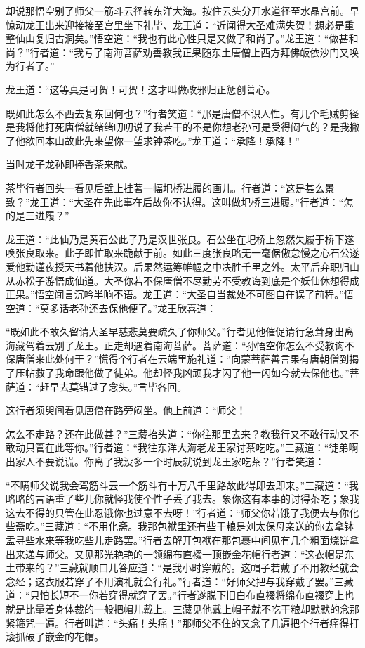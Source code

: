 \documentclass[12pt,UTF8]{ctexbook}
\begin{document}
{却说那悟空别了师父一筋斗云径转东洋大海。按住云头分开水道径至水晶宫前。早惊动龙王出来迎接接至宫里坐下礼毕、龙王道：“近闻得大圣难满失贺！想必是重整仙山复归古洞矣。”悟空道：“我也有此心性只是又做了和尚了。”龙王道：“做甚和尚？”行者道：“我亏了南海菩萨劝善教我正果随东土唐僧上西方拜佛皈依沙门又唤为行者了。”

龙王道：“这等真是可贺！可贺！这才叫做改邪归正惩创善心。

既如此怎么不西去复东回何也？”行者笑道：“那是唐僧不识人性。有几个毛贼剪径是我将他打死唐僧就绪绪叨叨说了我若干的不是你想老孙可是受得闷气的？是我撇了他欲回本山故此先来望你一望求钟茶吃。”龙王道：“承降！承降！”

当时龙子龙孙即捧香茶来献。

茶毕行者回头一看见后壁上挂著一幅圯桥进履的画儿。行者道：“这是甚么景致？”龙王道：“大圣在先此事在后故你不认得。这叫做圯桥三进履。”行者道：“怎的是三进履？”

龙王道：“此仙乃是黄石公此子乃是汉世张良。石公坐在圯桥上忽然失履于桥下遂唤张良取来。此子即忙取来跪献于前。如此三度张良略无一毫倨傲怠慢之心石公遂爱他勤谨夜授天书着他扶汉。后果然运筹帷幄之中决胜千里之外。太平后弃职归山从赤松子游悟成仙道。大圣你若不保唐僧不尽勤劳不受教诲到底是个妖仙休想得成正果。”悟空闻言沉吟半晌不语。龙王道：“大圣自当裁处不可图自在误了前程。”悟空道：“莫多话老孙还去保他便了。”龙王欣喜道：

“既如此不敢久留请大圣早慈悲莫要疏久了你师父。”行者见他催促请行急耸身出离海藏驾着云别了龙王。正走却遇着南海菩萨。菩萨道：“孙悟空你怎么不受教诲不保唐僧来此处何干？”慌得个行者在云端里施礼道：“向蒙菩萨善言果有唐朝僧到揭了压帖救了我命跟他做了徒弟。他却怪我凶顽我才闪了他一闪如今就去保他也。”菩萨道：“赶早去莫错过了念头。”言毕各回。

这行者须臾间看见唐僧在路旁闷坐。他上前道：“师父！

怎么不走路？还在此做甚？”三藏抬头道：“你往那里去来？教我行又不敢行动又不敢动只管在此等你。”行者道：“我往东洋大海老龙王家讨茶吃吃。”三藏道：“徒弟啊出家人不要说谎。你离了我没多一个时辰就说到龙王家吃茶？”行者笑道：

“不瞒师父说我会驾筋斗云一个筋斗有十万八千里路故此得即去即来。”三藏道：“我略略的言语重了些儿你就怪我使个性子丢了我去。象你这有本事的讨得茶吃；象我这去不得的只管在此忍饿你也过意不去呀！”行者道：“师父你若饿了我便去与你化些斋吃。”三藏道：“不用化斋。我那包袱里还有些干粮是刘太保母亲送的你去拿钵盂寻些水来等我吃些儿走路罢。”行者去解开包袱在那包裹中间见有几个粗面烧饼拿出来递与师父。又见那光艳艳的一领绵布直裰一顶嵌金花帽行者道：“这衣帽是东土带来的？”三藏就顺口儿答应道：“是我小时穿戴的。这帽子若戴了不用教经就会念经；这衣服若穿了不用演礼就会行礼。”行者道：“好师父把与我穿戴了罢。”三藏道：“只怕长短不一你若穿得就穿了罢。”行者遂脱下旧白布直裰将绵布直裰穿上也就是比量着身体裁的一般把帽儿戴上。三藏见他戴上帽子就不吃干粮却默默的念那紧箍咒一遍。行者叫道：“头痛！头痛！”那师父不住的又念了几遍把个行者痛得打滚抓破了嵌金的花帽。

}
\end{document}
